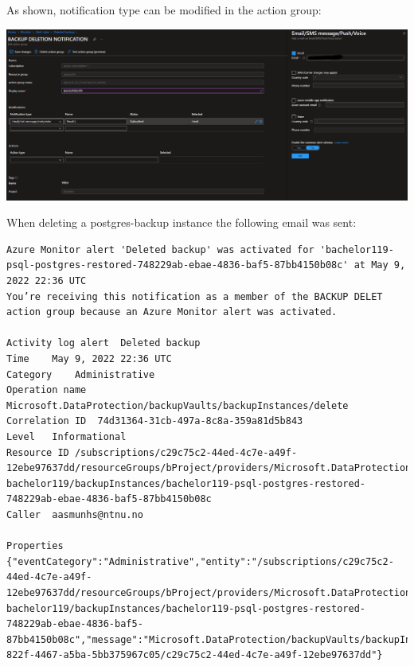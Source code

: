 As shown, notification type can be modified in the action group:

\includegraphics[width=.9\linewidth]{figures/postgresaasmund/20.PNG}

When deleting a postgres-backup instance the following email was sent:


\begin{verbatim}
Azure Monitor alert 'Deleted backup' was activated for 'bachelor119-psql-postgres-restored-748229ab-ebae-4836-baf5-87bb4150b08c' at May 9, 2022 22:36 UTC
You’re receiving this notification as a member of the BACKUP DELET action group because an Azure Monitor alert was activated.	

Activity log alert	Deleted backup
Time	May 9, 2022 22:36 UTC
Category	Administrative
Operation name	Microsoft.DataProtection/backupVaults/backupInstances/delete
Correlation ID	74d31364-31cb-497a-8c8a-359a81d5b843
Level	Informational
Resource ID	/subscriptions/c29c75c2-44ed-4c7e-a49f-12ebe97637dd/resourceGroups/bProject/providers/Microsoft.DataProtection/backupVaults/bVault-bachelor119/backupInstances/bachelor119-psql-postgres-restored-748229ab-ebae-4836-baf5-87bb4150b08c
Caller	aasmunhs@ntnu.no

Properties	{"eventCategory":"Administrative","entity":"/subscriptions/c29c75c2-44ed-4c7e-a49f-12ebe97637dd/resourceGroups/bProject/providers/Microsoft.DataProtection/backupVaults/bVault-bachelor119/backupInstances/bachelor119-psql-postgres-restored-748229ab-ebae-4836-baf5-87bb4150b08c","message":"Microsoft.DataProtection/backupVaults/backupInstances/delete","hierarchy":"09a10672-822f-4467-a5ba-5bb375967c05/c29c75c2-44ed-4c7e-a49f-12ebe97637dd"}

\end{verbatim}

